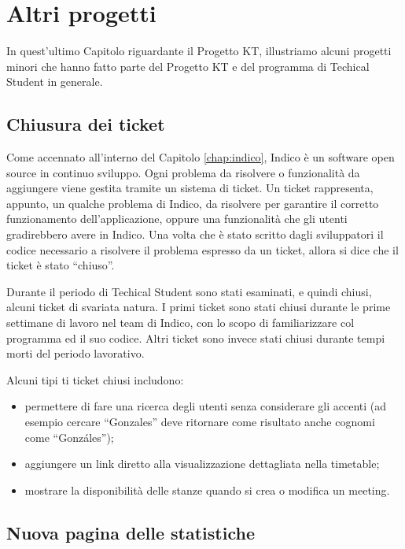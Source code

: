 \chapter{Altri progetti} \label{chap:altri_progetti}

    In quest'ultimo Capitolo riguardante il Progetto KT, illustriamo alcuni progetti minori che hanno fatto parte del Progetto KT e del programma di Techical Student in generale.

    \section{Chiusura dei ticket} \label{sec:ap;chiusura_ticket}
    
        Come accennato all'interno del Capitolo \ref{chap:indico}, Indico è un software open source in continuo sviluppo. Ogni problema da risolvere o funzionalità da aggiungere viene gestita tramite un sistema di ticket. Un ticket rappresenta, appunto, un qualche problema di Indico, da risolvere per garantire il corretto funzionamento dell'applicazione, oppure una funzionalità che gli utenti gradirebbero avere in Indico. Una volta che è stato scritto dagli sviluppatori il codice necessario a risolvere il problema espresso da un ticket, allora si dice che il ticket è stato ``chiuso''.
        
        Durante il periodo di Techical Student sono stati esaminati, e quindi chiusi, alcuni ticket di svariata natura. I primi ticket sono stati chiusi durante le prime settimane di lavoro nel team di Indico, con lo scopo di familiarizzare col programma ed il suo codice. Altri ticket sono invece stati chiusi durante tempi morti del periodo lavorativo.
        
        Alcuni tipi ti ticket chiusi includono:
        
        \begin{itemize}
            \item permettere di fare una ricerca degli utenti senza considerare gli accenti (ad esempio cercare ``Gonzales'' deve ritornare come risultato anche cognomi come ``Gonzáles'');
            \item aggiungere un link diretto alla visualizzazione dettagliata nella timetable;
            \item mostrare la disponibilità delle stanze quando si crea o modifica un meeting.
        \end{itemize}
    
    \section{Nuova pagina delle statistiche} \label{sec:ap;nuova_pagina_statistiche}
    
